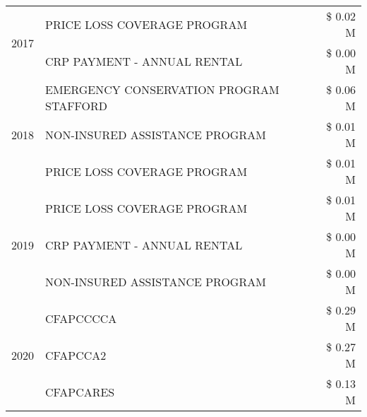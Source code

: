 \begin{tabular}{llr}
\cline{1-3}
\multirow[t]{2}{*}{2017} & PRICE LOSS COVERAGE PROGRAM & \$ 0.02 M \\
 & CRP PAYMENT - ANNUAL RENTAL & \$ 0.00 M \\
\cline{1-3}
\multirow[t]{3}{*}{2018} & EMERGENCY CONSERVATION PROGRAM STAFFORD & \$ 0.06 M \\
 & NON-INSURED ASSISTANCE PROGRAM & \$ 0.01 M \\
 & PRICE LOSS COVERAGE PROGRAM & \$ 0.01 M \\
\cline{1-3}
\multirow[t]{3}{*}{2019} & PRICE LOSS COVERAGE PROGRAM & \$ 0.01 M \\
 & CRP PAYMENT - ANNUAL RENTAL & \$ 0.00 M \\
 & NON-INSURED ASSISTANCE PROGRAM & \$ 0.00 M \\
\cline{1-3}
\multirow[t]{3}{*}{2020} & CFAPCCCCA & \$ 0.29 M \\
 & CFAPCCA2 & \$ 0.27 M \\
 & CFAPCARES & \$ 0.13 M \\
\cline{1-3}
\bottomrule
\end{tabular}
